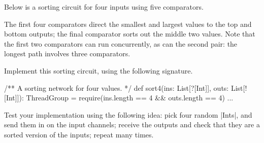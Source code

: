 \documentclass[12pt,a4paper]{article}
\def\comp#1#2#3{%
  \draw (#1)+(#3,0) node {$\bullet$};
  \draw (#2)+(#3,0) node (n2) {$\bullet$};
  \draw[thick] (#1)+(#3,0) -- (n2.center);
}
\begin{document}

Below is a sorting circuit for four inputs using five comparators.
%
\begin{center}
\end{center}
%
The first four comparators direct the smallest and largest values to the top
and bottom outputs; the final comparator sorts out the middle two values.
Note that the first two comparators can run concurrently, as can the second
pair: the longest path involves  three comparators.

\begin{question}
\label{Q:sort4}
Implement this sorting circuit, using the following
signature.%
%  
\begin{scala}
  /** A sorting network for four values. */
  def sort4(ins: List[?[Int]], outs: List[![Int]]): ThreadGroup = {
    require(ins.length == 4 && outs.length == 4)
    ...
  }
\end{scala}

Test your implementation using the following idea: pick four random |Ints|,
and send them in on the input channels; receive the outputs and check that
they are a sorted version of the inputs; repeat many times.
\end{question}

\end{document}
